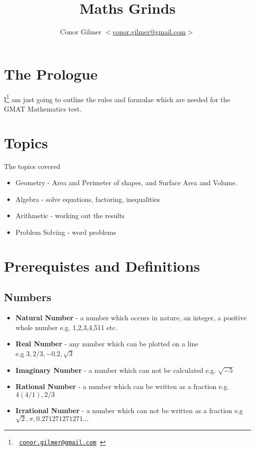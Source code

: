 \documentclass{article}
\title{\gmat{} Maths Grinds}
\author{Conor Gilmer $<$\href{mailto:conor.gilmer@gmail.com}{conor.gilmer@gmail.com}$>$}
\newcommand{\email}[1]{\texttt{#1}}
\begin{document}
\pagestyle{headings}
\maketitle

\tableofcontents


\newpage
\section{The Prologue}
I\footnote{\email{ \href{mailto:conor.gilmer@gmail.com.com}{conor.gilmer@gmail.com} }} am just going to outline the rules and formulae which are needed for the GMAT Mathematics test.

\section{Topics}

The topics covered

\begin{itemize}
\item Geometry - Area and Perimeter of shapes, and Surface Area and Volume.
\item Algebra - solve equations, factoring, inequalities
\item Arithmetic - working out the results
\item Problem Solving - word problems
\end{itemize}


\newpage
\section{Prerequistes and Definitions}
\subsection{Numbers}
\begin{itemize}
\item {\textbf{Natural Number} - a number which occurs in nature, an integer, a positive whole number e.g. 1,2,3,4,511 etc.}
\item {\textbf{Real Number} - any number which can be plotted on a line \\ e.g $3, 2/3, -0.2, \sqrt{3}$}
\item \textbf{Imaginary Number} - a number which can not be calculated e.g. $\sqrt{-5}$
\item \textbf{Rational Number} - a number which can be written as a fraction e.g. $4 (4/1) , 2/3$
\item \textbf{Irrational Number} - a number which can not be written as a fraction e.g $\sqrt{2}, \pi, 0.271271271271...$
\end{itemize}
\end{document}
